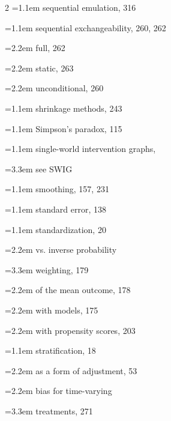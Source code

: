 \begin{multicols}{2}
\hangindent=1.1em sequential emulation, 316\par
\hangindent=1.1em sequential exchangeability, 260, 262\par
\hspace*{1.1em}\hangindent=2.2em full, 262\par
\hspace*{1.1em}\hangindent=2.2em static, 263\par
\hspace*{1.1em}\hangindent=2.2em unconditional, 260\par
\hangindent=1.1em shrinkage methods, 243\par
\hangindent=1.1em Simpson's paradox, 115\par
\hangindent=1.1em single-world intervention graphs,\par
\hspace*{2.2em}\hangindent=3.3em see SWIG\par
\hangindent=1.1em smoothing, 157, 231\par
\hangindent=1.1em standard error, 138\par
\hangindent=1.1em standardization, 20\par
\hspace*{1.1em}\hangindent=2.2em vs. inverse probability\par
\hspace*{2.2em}\hangindent=3.3em weighting, 179\par
\hspace*{1.1em}\hangindent=2.2em of the mean outcome, 178\par
\hspace*{1.1em}\hangindent=2.2em with models, 175\par
\hspace*{1.1em}\hangindent=2.2em with propensity scores, 203\par
\hangindent=1.1em stratification, 18\par
\hspace*{1.1em}\hangindent=2.2em as a form of adjustment, 53\par
\hspace*{1.1em}\hangindent=2.2em bias for time-varying\par
\hspace*{2.2em}\hangindent=3.3em treatments, 271\par

\end{multicols}
